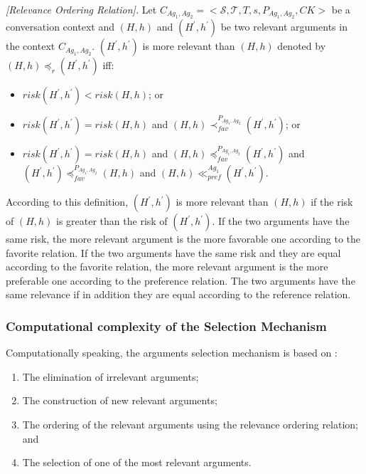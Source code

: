 \begin{definition}{\emph{[Relevance Ordering Relation].}} \label{relevance}
Let $C_{Ag_1,Ag_2} = \big<\mathcal{S},\mathcal{T},T, s,P_{Ag_1,Ag_2},CK\big>$ be a conversation context and $(H, h)$
and $(H^{\prime},h^{\prime})$ be two relevant arguments in the context $C_{Ag_1,Ag_2}$. $(H^{\prime},h^{\prime})$ is more
relevant than $(H, h)$ denoted by $(H, h) \preceq_r (H^{\prime},h^{\prime})$ iff:
\begin{itemize}
\item $risk(H^{\prime},h^{\prime}) < risk(H, h)$; or

\item $risk(H^{\prime},h^{\prime}) = risk(H, h)$ and $(H, h) \prec_{fav}^{P_{Ag_1,Ag_2}} (H^{\prime},h^{\prime})$; or

\item $risk(H^{\prime},h^{\prime}) = risk(H, h)$ and $(H, h) \preceq_{fav}^{P_{Ag_1,Ag_2}} (H^{\prime},h^{\prime})$ and
$(H^{\prime},h^{\prime}) \preceq_{fav}^{P_{Ag_1,Ag_2}} (H,h)$ and $(H,h) \ll_{pref}^{Ag_1} (H^{\prime},h^{\prime}) $.
\end{itemize}
\end{definition}

According to this definition, $(H^{\prime},h^{\prime})$ is more relevant than $(H, h)$ if the risk of $(H, h)$ is greater than the
risk of $(H^{\prime},h^{\prime})$. If the two arguments have the same risk, the more relevant argument is the more favorable one
according to the favorite relation. If the two arguments have the same risk and they are equal according to the favorite relation,
the more relevant argument is the more preferable one according to the preference relation. The two arguments have the same relevance
if in addition they are equal according to the reference relation.

\subsubsection{Computational complexity of the Selection Mechanism}

Computationally speaking, the arguments selection mechanism is based on :
\begin{enumerate}
 \item The elimination of irrelevant arguments;
 \item The construction of new relevant arguments;
 \item The ordering of the relevant arguments using the relevance ordering relation; and
 \item The selection of one of the most relevant arguments.

\end{enumerate}


